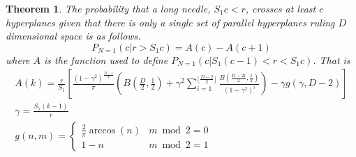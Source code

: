 \documentclass{article}
\newtheorem{theorem}{Theorem}
\begin{document}
\begin{theorem} \label{t:long needle}
	The probability that a long needle, $S_1c<r$, crosses at least $c$ hyperplanes given that there is only
	a single set of parallel hyperplanes ruling $D$ dimensional space is as follows.
	\begin{equation}
		P_{N=1}(c|r>S_1c) = A(c) - A(c+1)
	\end{equation}
	where $A$ is the function used to define $P_{N=1}(c|S_1(c-1)<r<S_1c)$. That is
	\begin{gather}
		A(k) = \frac{r}{S_1} \left[\frac{(1-\gamma^2)^{\frac{D-1}{2}}}{\pi} \left(B\left(\frac{D}{2}, \frac{1}{2} \right) + \gamma^2 \sum_{i=1}^{\lfloor \frac{D-2}{2} \rfloor}\frac{B(\frac{D-2i}{2}, \frac{1}{2})}{(1-\gamma^2)^i}\right) - \gamma g(\gamma, D-2) \right] \\
		\gamma = \frac{S_1(k-1)}{r} \\
		g(n, m) = \begin{cases}
			\frac{2}{\pi}\arccos(n) & m\bmod 2 = 0 \\
			1-n & m \bmod 2 = 1
		\end{cases}
	\end{gather}
\end{theorem}
\end{document}
